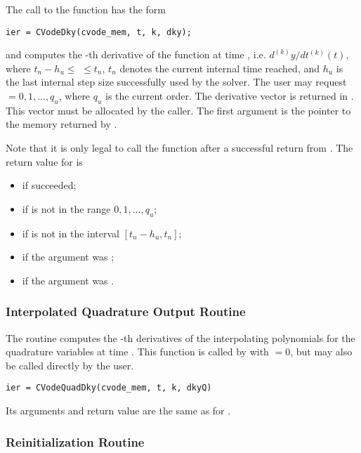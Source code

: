 The call to the  function has the form
\begin{verbatim}
ier = CVodeDky(cvode_mem, t, k, dky);
\end{verbatim}
and computes the -th derivative of the  function at      
time , i.e. $d^{(k)}y/dt^{(k)} (t)$, where $t_n - h_u \le$  $\le t_n$, 
$t_n$ denotes the current internal time reached, and $h_u$ is the 
last internal step size successfully used by the solver. 
The user may request  $= 0, 1, ..., q_u$, where $q_u$ is the 
current order. The derivative vector is returned in . 
This vector must be allocated by the caller. 
The first argument  is the pointer to the {\cvodes}
memory returned by .

Note that it is only legal to call the function  after a 
successful return from .
The return value  for  is
\begin{itemize}
\item {} if  succeeded;
\item {} if  is not in the range $0, 1, ..., q_u$;
\item {} if  is not in the interval $[t_n - h_u , t_n]$;
\item {} if the  argument was ;
\item {} if the  argument was .
\end{itemize}

\subsubsection{Interpolated Quadrature Output Routine}

The routine  computes the -th derivatives of the interpolating 
polynomials for the quadrature variables at time .
This function is called by  with  $= 0$, but may also be called 
directly by the user.
\begin{verbatim}
ier = CVodeQuadDky(cvode_mem, t, k, dkyQ)
\end{verbatim}
Its arguments and return value are the same as for .

\subsubsection{{\cvodes} Reinitialization Routine}\label{sss:cvreinit}

